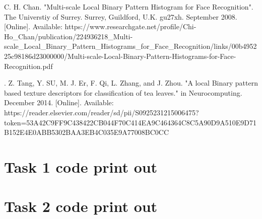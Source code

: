 \documentclass[conference]{IEEEtran}
\begin{document}
\begin{thebibliography}{00}
 C. H. Chan. "Multi-scale Local Binary Pattern Histogram for Face Recognition". The Universtiy of Surrey. Surrey, Guildford, U.K. gu27xh. September 2008. [Online]. Available: https://www.researchgate.net/profile/Chi-Ho\_Chan/publication/224936218\_Multi-scale\_Local\_Binary\_Pattern\_Histograms\_for\_Face\_Recognition/links/00b495225c98186d23000000/Multi-scale-Local-Binary-Pattern-Histograms-for-Face-Recognition.pdf

. Z. Tang, Y. SU, M. J. Er, F. Qi, L. Zhang, and J. Zhou. "A local Binary pattern based texture descriptors for classification of tea leaves." in Neurocomputing. December 2014. [Online]. Available: https://reader.elsevier.com/reader/sd/pii/S0925231215006475?token=53A42C9FF9C438422CB044F70C414EA9C464364C8C5A90D9A510E9D71B152E4E0ABB5302BAA3EB4C035E9A77008BC0CC


\end{thebibliography}

\appendix

\begin{appendices}
	\section{Task 1 code print out}\label{ap 1}

	\section{Task 2 code print out}
\end{appendices}
\end{document}
